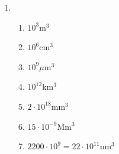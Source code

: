 \documentclass[a4paper]{article}
\begin{document}
\begin{enumerate}
\item %
  \begin{enumerate}
  \item $10^3$m$^3$ %
  \item $10^6$cm$^3$ %
  \item $10^9\mu$m$^3$ %
  \item $10^{12}$km$^3$ %
  \item $2\cdot 10^{18}$mm$^3$ %
  \item $15\cdot 10^{-9}$Mm$^3$ %
  \item $2200 \cdot 10^9 = 22 \cdot 10^{11}$nm$^3$ %
  \end{enumerate}


\end{enumerate}
\end{document}
